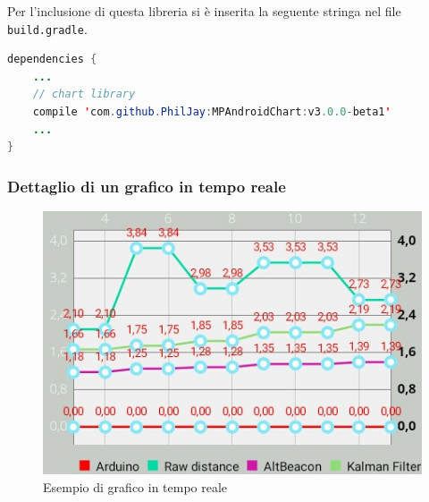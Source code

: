 Per l'inclusione di questa libreria si è inserita la seguente stringa nel file \texttt{build.gradle}.
\begin{lstlisting}[language=Java]
dependencies {
	...
	// chart library
	compile 'com.github.PhilJay:MPAndroidChart:v3.0.0-beta1'
	...
}
\end{lstlisting}

\subsubsection{Dettaglio di un grafico in tempo reale}
\begin{figure}[ph]
	\centering
	\includegraphics[width=0.6\linewidth]{img/app/chart1.jpg}
	\caption{Esempio di grafico in tempo reale}
	\label{fig:chart1}
\end{figure}



